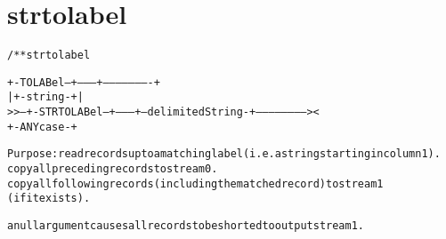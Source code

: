 \section{strtolabel}
\begin{shaded}
\begin{alltt}
/** strtolabel

       +-TOLABel--+--------+----------------------+
       |          +-string-+                      |
   >>--+-STRTOLABel--+---------+--delimitedString-+-----------------------><
                     +-ANYcase-+

  Purpose: read records up to a matching label (i.e. a string starting in column 1).
           copy all preceding records to stream 0.
           copy all following records (including the matched record) to stream 1
             (if it exists).

           a null argument causes all records to be shorted to output stream 1.

\end{alltt}
\end{shaded}
